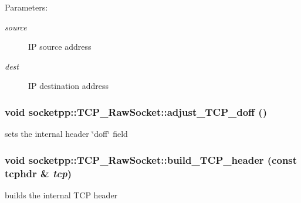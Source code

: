 \begin{Desc}
\item[Parameters:]
\begin{description}
\item[{\em source}]IP source address \item[{\em dest}]IP destination address \end{description}
\end{Desc}
\hypertarget{classsocketpp_1_1TCP__RawSocket_029eb8bfbf19531253edf046775d9f5f}{
\subsubsection[{adjust\_\-TCP\_\-doff}]{\setlength{\rightskip}{0pt plus 5cm}void socketpp::TCP\_\-RawSocket::adjust\_\-TCP\_\-doff ()}}
\label{classsocketpp_1_1TCP__RawSocket_029eb8bfbf19531253edf046775d9f5f}


sets the internal header \char`\"{}doff\char`\"{} field 

\hypertarget{classsocketpp_1_1TCP__RawSocket_8c35edfc4d8c2fbccf0fe13485dd2ef1}{
\subsubsection[{build\_\-TCP\_\-header}]{\setlength{\rightskip}{0pt plus 5cm}void socketpp::TCP\_\-RawSocket::build\_\-TCP\_\-header (const tcphdr \& {\em tcp})}}
\label{classsocketpp_1_1TCP__RawSocket_8c35edfc4d8c2fbccf0fe13485dd2ef1}


builds the internal TCP header 

